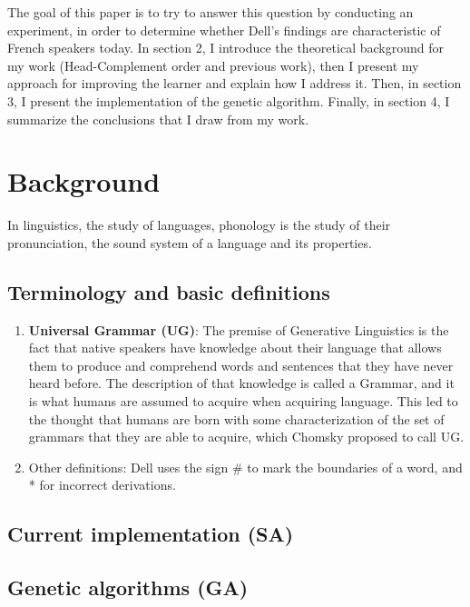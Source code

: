 \documentclass{article}
\begin{document}
The goal of this paper is to try to answer this question by conducting an experiment, in order to determine whether Dell's findings are characteristic of  French speakers today. 
In section 2, I introduce the theoretical background for my work (Head-Complement order and previous work),  then I present my approach for improving the learner and explain how I address it. 
Then,  in section 3,  I present the implementation of the genetic algorithm. 
Finally,  in section 4,  I summarize the conclusions that I draw from my work.

\clearpage
\section{Background} %
In linguistics, the study of languages, phonology is the study of their pronunciation,  the sound system of a language and its properties.

\subsection{Terminology and basic definitions} %
\begin{enumerate}

  \item \textbf{Universal Grammar (UG)}: The premise of Generative Linguistics is the fact that native speakers have knowledge about
their language that allows them to produce and comprehend words and sentences that they have never heard before. The description of that knowledge is called a Grammar, and it is what humans are assumed to acquire when acquiring language. This led to the thought that humans are born with some characterization of the set of grammars that they are able to acquire,  which Chomsky proposed to call UG.
  \item Other definitions: Dell uses the sign \# to mark the boundaries of a word, and * for incorrect derivations.

\end{enumerate}


\subsection{Current implementation (SA)}
\subsection{Genetic algorithms (GA)}
\end{document}
